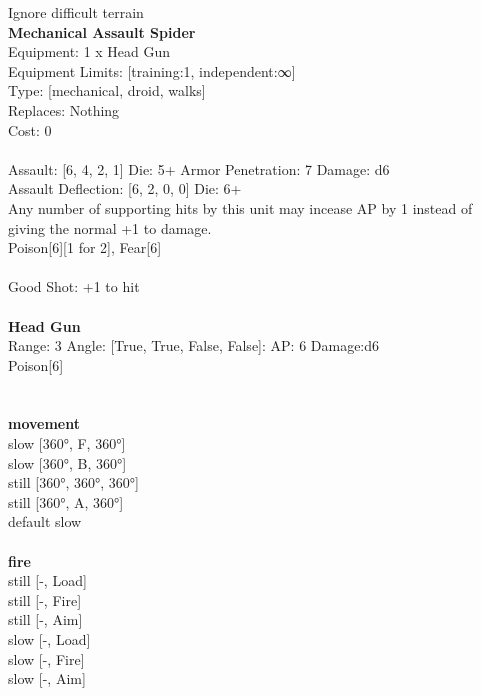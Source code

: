 \noindent Ignore difficult terrain\\ 


{\bf Mechanical Assault Spider } \\
Equipment: 1 x Head Gun \\
Equipment Limits: [training:1, independent:∞] \\
Type: [mechanical, droid, walks] \\
Replaces: Nothing \\
Cost: 0\\
\ \\
Assault: [6, 4, 2, 1] Die: 5+ Armor Penetration: 7 Damage: d6 \\
Assault Deflection: [6, 2, 0, 0] Die: 6+\\
\indent Any number of supporting hits by this unit may incease AP by 1 instead of giving the normal +1 to damage.\\ 
Poison[6][1 for 2], Fear[6]\\ 
 
\ \\
Good Shot: +1 to hit\\ 

\ \\
{\bf Head Gun } \\



Range: 3  Angle: [True, True, False, False]: AP: 6 Damage:d6 \\
Poison[6]\\ 




 
\ \\



\ \\ {\bf movement } \\
slow [360°, F, 360°] \\
slow [360°, B, 360°] \\
still [360°, 360°, 360°] \\
still [360°, A, 360°] \\
default slow \\
\ \\ {\bf fire } \\
still [-, Load] \\
still [-, Fire] \\
still [-, Aim] \\
slow [-, Load] \\
slow [-, Fire] \\
slow [-, Aim] \\


